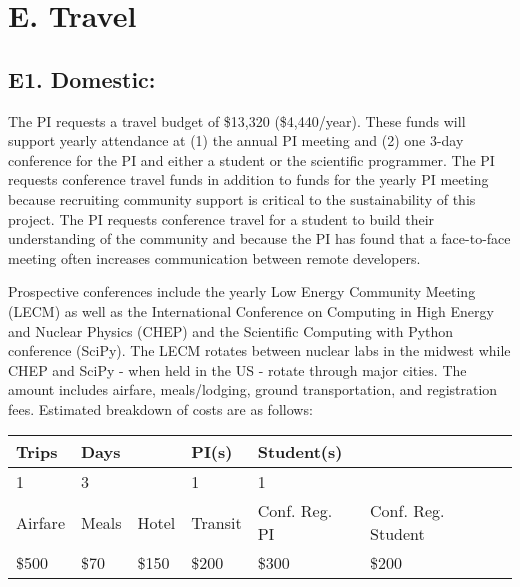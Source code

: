 \documentclass[11pt,oneside]{memoir}
\begin{document}
\section*{E. Travel}

\subsection{E1. Domestic:}
The PI requests a travel budget of \$13,320 (\$4,440/year).  These funds will support yearly attendance at (1) the annual PI meeting and (2) one 3-day conference for the PI and either a student or the scientific programmer.  
The PI requests conference travel funds in addition to funds for the yearly PI meeting because recruiting community support is critical to the sustainability of this project.  The PI requests conference travel for a student to build their understanding of the community and because the PI has found that a face-to-face meeting often increases communication between remote developers. 

Prospective conferences include the yearly Low Energy Community Meeting (LECM) as well as the International Conference on Computing in High Energy and Nuclear Physics (CHEP) and the Scientific Computing with Python conference (SciPy).  The LECM rotates between nuclear labs in the midwest while CHEP and SciPy - when held in the US - rotate through major cities.  The amount includes airfare, meals/lodging, ground transportation, and registration fees. Estimated breakdown of costs are as follows:


\begin{minipage}{\linewidth}
    \centering
    \begin{tabular}{ llllll } 
    \toprule
     Trips & Days & & PI(s) & Student(s) & \\
     \midrule
     1 & 3 & & 1 & 1 &  \\ 
     \addlinespace[1ex]
     Airfare & Meals & Hotel & Transit & Conf. Reg. PI & Conf. Reg. Student\\ 
     \midrule
     \$500 & \$70 & \$150 & \$200 & \$300 & \$200 \\ 
     \bottomrule
   \end{tabular}
     \label{tab:title} 
\end{minipage}
    
\end{document}
